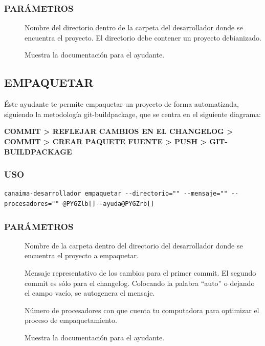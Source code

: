 \documentclass[letterpaper,12pt,spanish]{manual}
\begin{document}
\subsubsection{PARÁMETROS}
\begin{description}
\item[{}] \leavevmode
Nombre del directorio dentro de la carpeta del desarrollador donde se encuentra el proyecto. El directorio debe contener un proyecto debianizado.

\item[{}] \leavevmode
Muestra la documentación para el ayudante.

\end{description}


\subsection{\textbf{EMPAQUETAR}}

Éste ayudante te permite empaquetar un proyecto de forma automatizada, siguiendo la metodología git-buildpackage, que se centra en el siguiente diagrama:

\textbf{COMMIT \textgreater{} REFLEJAR CAMBIOS EN EL CHANGELOG \textgreater{} COMMIT \textgreater{} CREAR PAQUETE FUENTE \textgreater{} PUSH \textgreater{} GIT-BUILDPACKAGE}


\subsubsection{USO}

\begin{Verbatim}[commandchars=@\[\]]
canaima-desarrollador empaquetar --directorio="" --mensaje="" --procesadores="" @PYGZlb[]--ayuda@PYGZrb[]
\end{Verbatim}


\subsubsection{PARÁMETROS}
\begin{description}
\item[{}] \leavevmode
Nombre de la carpeta dentro del directorio del desarrollador donde se encuentra el proyecto a empaquetar.

\item[{}] \leavevmode
Mensaje representativo de los cambios para el primer commit. El segundo commit es sólo para el changelog. Colocando la palabra ``auto'' o dejando el campo vacío, se autogenera el mensaje.

\item[{}] \leavevmode
Número de procesadores con que cuenta tu computadora para optimizar el proceso de empaquetamiento.

\item[{}] \leavevmode
Muestra la documentación para el ayudante.

\end{description}
\end{document}
